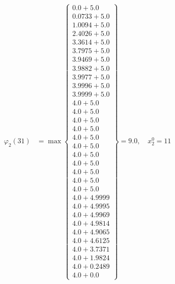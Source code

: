 \documentclass{article}
\begin{document}
\begin{align*}
\varphi_{2}(31) &= \max \left\{ \begin{array}{c}
0.0 + 5.0 \\
 0.0733 + 5.0 \\
 1.0094 + 5.0 \\
 2.4026 + 5.0 \\
 3.3614 + 5.0 \\
 3.7975 + 5.0 \\
 3.9469 + 5.0 \\
 3.9882 + 5.0 \\
 3.9977 + 5.0 \\
 3.9996 + 5.0 \\
 3.9999 + 5.0 \\
 4.0 + 5.0 \\
 4.0 + 5.0 \\
 4.0 + 5.0 \\
 4.0 + 5.0 \\
 4.0 + 5.0 \\
 4.0 + 5.0 \\
 4.0 + 5.0 \\
 4.0 + 5.0 \\
 4.0 + 5.0 \\
 4.0 + 5.0 \\
 4.0 + 5.0 \\
 4.0 + 4.9999 \\
 4.0 + 4.9995 \\
 4.0 + 4.9969 \\
 4.0 + 4.9814 \\
 4.0 + 4.9065 \\
 4.0 + 4.6125 \\
 4.0 + 3.7371 \\
 4.0 + 1.9824 \\
 4.0 + 0.2489 \\
 4.0 + 0.0
\end{array} \right\}=9.0, \quad x_{2}^0=11\\
  

\end{align*}
\end{document}
